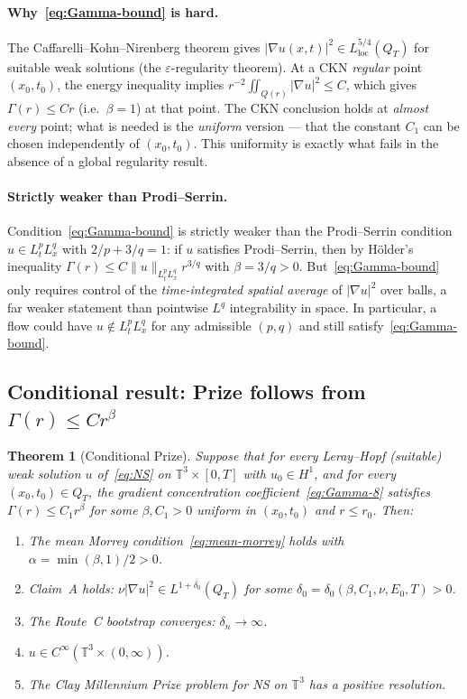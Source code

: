 \documentclass[11pt]{article}
\newtheorem{theorem}{Theorem}[section]
\theoremstyle{definition}
\theoremstyle{remark}
\newcommand{\T}{\mathbb{T}}
\newcommand{\Hs}[1]{H^{#1}}
\newcommand{\grad}{\nabla}
\newcommand{\dlt}{\delta}
\newcommand{\eps}{\varepsilon}
\begin{document}
\paragraph{Why~\eqref{eq:Gamma-bound} is hard.}
The Caffarelli--Kohn--Nirenberg theorem \cite{CKN1982} gives
$|\grad u(x,t)|^2\in L^{5/4}_{\mathrm{loc}}(Q_T)$ for suitable
weak solutions (the $\eps$-regularity theorem).  At a CKN \emph{regular}
point $(x_0,t_0)$, the energy inequality implies
$r^{-2}\iint_{Q(r)}|\grad u|^2\leq C$, which gives $\Gamma(r)\leq Cr$
(i.e.\ $\beta=1$) at that point.  The CKN conclusion holds at
\emph{almost every} point; what is needed is the \emph{uniform} version
— that the constant $C_1$ can be chosen independently of $(x_0,t_0)$.
This uniformity is exactly what fails in the absence of a global
regularity result.

\paragraph{Strictly weaker than Prodi--Serrin.}
Condition~\eqref{eq:Gamma-bound} is strictly weaker than the
Prodi--Serrin condition $u\in L^p_tL^q_x$ with $2/p+3/q=1$:
if $u$ satisfies Prodi--Serrin, then by H\"older's inequality
$\Gamma(r)\leq C\|u\|_{L^p_tL^q_x}r^{3/q}$ with $\beta=3/q>0$.
But~\eqref{eq:Gamma-bound} only requires control of the
\emph{time-integrated spatial average} of $|\grad u|^2$ over balls,
a far weaker statement than pointwise $L^q$ integrability in space.
In particular, a flow could have $u\notin L^p_tL^q_x$ for any
admissible $(p,q)$ and still satisfy~\eqref{eq:Gamma-bound}.

\subsection{Conditional result: Prize follows from $\Gamma(r)\leq Cr^\beta$}
\label{sec:conditional}

\begin{theorem}[Conditional Prize]\label{thm:conditional-prize}
  Suppose that for every Leray--Hopf (suitable) weak solution $u$
  of~\eqref{eq:NS} on $\T^3\times[0,T]$ with $u_0\in\Hs{1}$, and for
  every $(x_0,t_0)\in Q_T$, the gradient concentration
  coefficient~\eqref{eq:Gamma-8} satisfies
  $\Gamma(r)\leq C_1 r^\beta$ for some $\beta,C_1>0$ uniform in
  $(x_0,t_0)$ and $r\leq r_0$.  Then:
  \begin{enumerate}[label=(\roman*)]
    \item The mean Morrey condition~\eqref{eq:mean-morrey} holds
      with $\alpha=\min(\beta,1)/2>0$.
    \item Claim~A holds: $\nu|\grad u|^2\in L^{1+\dlt_0}(Q_T)$ for some
      $\dlt_0=\dlt_0(\beta,C_1,\nu,E_0,T)>0$.
    \item The Route~C bootstrap converges: $\dlt_n\to\infty$.
    \item $u\in C^\infty(\T^3\times(0,\infty))$.
    \item The Clay Millennium Prize problem for NS on $\T^3$ has a
      positive resolution.
  \end{enumerate}
\end{theorem}
\end{document}
